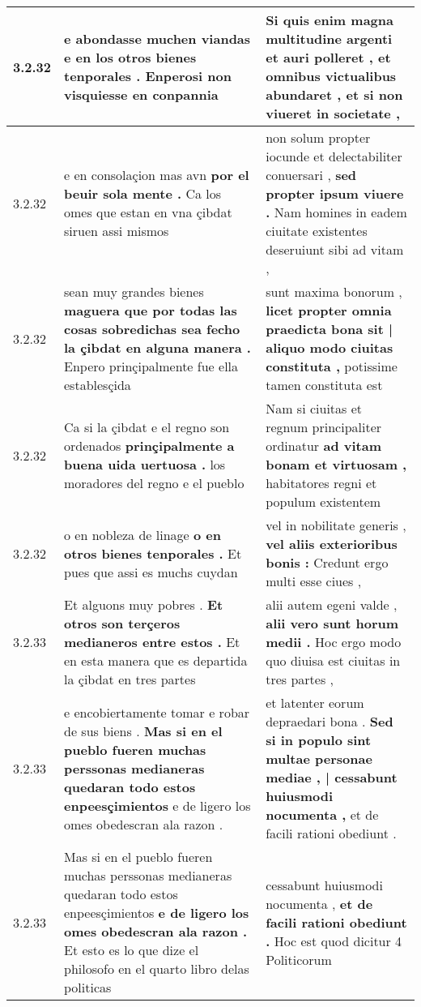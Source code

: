 \begin{tabular}{|p{1cm}|p{6.5cm}|p{6.5cm}|}
3.2.32 & e abondasse muchen viandas \textbf{ e en los otros bienes tenporales . } Enperosi non visquiesse en conpannia & Si quis enim magna multitudine argenti et auri polleret , \textbf{ et omnibus victualibus abundaret , } et si non viueret in societate , \\\hline
3.2.32 & e en consolaçion mas avn \textbf{ por el beuir sola mente . } Ca los omes que estan en vna çibdat siruen assi mismos & non solum propter iocunde et delectabiliter conuersari , \textbf{ sed propter ipsum viuere . } Nam homines in eadem ciuitate existentes deseruiunt sibi ad vitam , \\\hline
3.2.32 & sean muy grandes bienes \textbf{ maguera que por todas las cosas sobredichas sea fecho la çibdat en alguna manera . } Enpero prinçipalmente fue ella establesçida & sunt maxima bonorum , \textbf{ licet propter omnia praedicta bona sit | aliquo modo ciuitas constituta , } potissime tamen constituta est \\\hline
3.2.32 & Ca si la çibdat e el regno son ordenados \textbf{ prinçipalmente a buena uida uertuosa . } los moradores del regno e el pueblo & Nam si ciuitas et regnum principaliter ordinatur \textbf{ ad vitam bonam et virtuosam , } habitatores regni et populum existentem \\\hline
3.2.32 & o en nobleza de linage \textbf{ o en otros bienes tenporales . } Et pues que assi es muchs cuydan & vel in nobilitate generis , \textbf{ vel aliis exterioribus bonis : } Credunt ergo multi esse ciues , \\\hline
3.2.33 & Et alguons muy pobres . \textbf{ Et otros son terçeros medianeros entre estos . } Et en esta manera que es departida la çibdat en tres partes & alii autem egeni valde , \textbf{ alii vero sunt horum medii . } Hoc ergo modo quo diuisa est ciuitas in tres partes , \\\hline
3.2.33 & e encobiertamente tomar e robar de sus biens . \textbf{ Mas si en el pueblo fueren muchas perssonas medianeras quedaran todo estos enpeesçimientos } e de ligero los omes obedescran ala razon . & et latenter eorum depraedari bona . \textbf{ Sed si in populo sint multae personae mediae , | cessabunt huiusmodi nocumenta , } et de facili rationi obediunt . \\\hline
3.2.33 & Mas si en el pueblo fueren muchas perssonas medianeras quedaran todo estos enpeesçimientos \textbf{ e de ligero los omes obedescran ala razon . } Et esto es lo que dize el philosofo en el quarto libro delas politicas & cessabunt huiusmodi nocumenta , \textbf{ et de facili rationi obediunt . } Hoc est quod dicitur 4 Politicorum \\\hline

\end{tabular}
